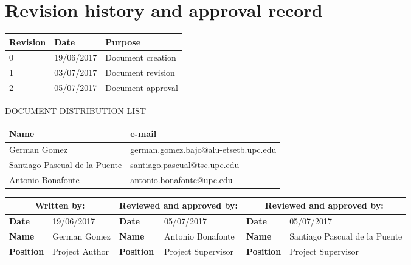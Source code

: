 
\chapter*{Revision history and approval record}

\begin{table}[h]
\centering
\begin{tabular}{| m{5em}| m{10em} | m{15em} |}
\hline
\textbf{Revision} & \textbf{Date} & \textbf{Purpose}\\ [0.5ex]
\hline
0   &   19/06/2017  &   Document creation   \\ [0.5ex]
\hline
1   &   03/07/2017  &   Document revision   \\ [0.5ex]
\hline
2   &   05/07/2017  &   Document approval   \\ [0.5ex]
\hline
\end{tabular}
\end{table}

\vspace{2cm}

DOCUMENT DISTRIBUTION LIST

\begin{table}[h]
\centering
\begin{tabular}{| m{15em}| m{20em}|}
\hline
\textbf{Name} & \textbf{e-mail} \\ [0.5ex]
\hline
German Gomez         & german.gomez.bajo@alu-etsetb.upc.edu \\ [0.5ex]
\hline
Santiago Pascual de la Puente & santiago.pascual@tsc.upc.edu \\ [0.5ex]
\hline
Antonio Bonafonte       & antonio.bonafonte@upc.edu \\ [0.5ex]
\hline
\end{tabular}
\end{table}

\vspace{2cm}

\begin{table}[h]
\centering
\begin{tabular}{| m{4em}| m{7em}| m{4em}| m{7em}| m{4em}| m{7em}|}
\hline
\multicolumn{2}{|c|}{\textbf{Written by:}} & \multicolumn{2}{c}{\textbf{Reviewed and approved by:}} & \multicolumn{2}{|c|}{\textbf{Reviewed and approved by:}} \\ [0.5ex]
\hline
\textbf{Date}     & 19/06/2017 & \textbf{Date} & 05/07/2017 & \textbf{Date} & 05/07/2017\\ [0.5ex]
\hline
\textbf{Name}     & German Gomez & \textbf{Name} & Antonio Bonafonte & \textbf{Name} & Santiago Pascual de la Puente \\ [0.5ex]
\hline
\textbf{Position} & Project Author & \textbf{Position} & Project Supervisor & \textbf{Position} & Project Supervisor \\ [0.5ex]
\hline
\end{tabular}
\end{table}
